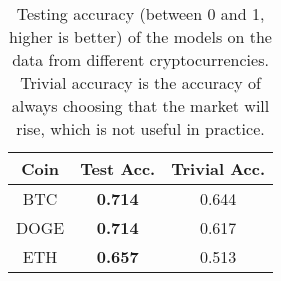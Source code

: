 \documentclass{article}
\begin{document}
\begin{table}
	\centering
	\caption{
        Testing accuracy (between 0 and 1, higher is better) of 
        the models on the data from different cryptocurrencies.
        Trivial accuracy is the accuracy of always choosing that the market will rise,
        which is not useful in practice.
	}
    \begin{tabular}{ccc} \toprule
       Coin & Test Acc. & Trivial Acc. \\
    \midrule
        BTC & \bf{0.714} &  0.644 \\
        DOGE & \bf{0.714} & 0.617 \\
       ETH & \bf{0.657} & 0.513 \\
    \bottomrule
    \end{tabular}
    \vspace{-15pt}
\end{table}
\end{document}

